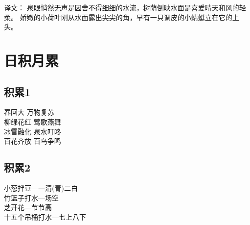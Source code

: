 译文：
泉眼悄然无声是因舍不得细细的水流，树荫倒映水面是喜爱晴天和风的轻柔。
娇嫩的小荷叶刚从水面露出尖尖的角，早有一只调皮的小蜻蜓立在它的上头。

\section{日积月累}
\subsection{积累1}
\begin{pinyinscope}
	\huge
	\noindent 春回大 \quad 万物复苏\\
	柳绿花红 \quad 莺歌燕舞\\
	冰雪融化 \quad 泉水叮咚\\
	百花齐放 \quad 百鸟争鸣
\end{pinyinscope}

\subsection{积累2}
\begin{pinyinscope}
	\huge
	\noindent 小葱拌豆---一清(青)二白\\
	竹篮子打水---场空\\
	芝开花---节节高\\
	十五个吊桶打水---七上八下
\end{pinyinscope}
